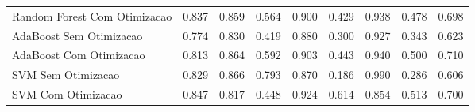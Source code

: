\begin{table}[H]
\begin{adjustwidth}{ -1in }{ -1in }
\begin{tabular}{lrrrrrrrr}
      Random Forest Com Otimizacao &                        0.837 &                         0.859 &                            0.564 &                            0.900 &                          0.429 &                          0.938 &                                     0.478 &                                 0.698 \\
           AdaBoost Sem Otimizacao &                        0.774 &                         0.830 &                            0.419 &                            0.880 &                          0.300 &                          0.927 &                                     0.343 &                                 0.623 \\
           AdaBoost Com Otimizacao &                        0.813 &                         0.864 &                            0.592 &                            0.903 &                          0.443 &                          0.940 &                                     0.500 &                                 0.710 \\
                SVM Sem Otimizacao &                        0.829 &                         0.866 &                            0.793 &                            0.870 &                          0.186 &                          0.990 &                                     0.286 &                                 0.606 \\
                SVM Com Otimizacao &                        0.847 &                         0.817 &                            0.448 &                            0.924 &                          0.614 &                          0.854 &                                     0.513 &                                 0.700 \\
\bottomrule
\end{tabular}
    \end{adjustwidth}
    \renewcommand{\arraystretch}{1.0} %
\end{table}
